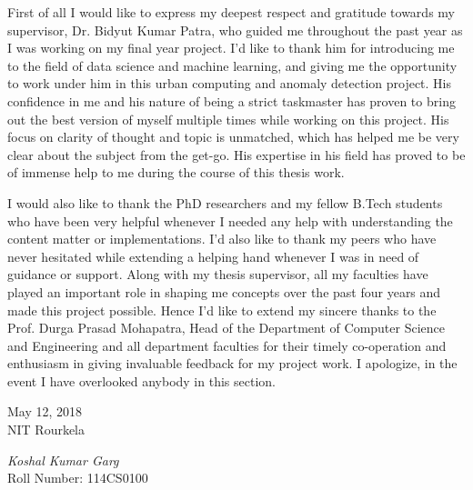 \thispagestyle{empty} 
\noindent 

First of all I would like to express my deepest respect and gratitude towards my supervisor,
Dr. Bidyut Kumar Patra, who guided me throughout the past year as I was working on my
final year project. I’d like to thank him for introducing me to the field of data science and
machine learning, and giving me the opportunity to work under him in this urban computing and anomaly detection 
project. His confidence in me and his nature of being a strict taskmaster has proven to bring
out the best version of myself multiple times while working on this project. His focus on
clarity of thought and topic is unmatched, which has helped me be very clear about the
subject from the get-go. His expertise in his field has proved to be of immense help to me
during the course of this thesis work.

\par

I would also like to thank the PhD researchers and my fellow B.Tech students who have been very helpful whenever I needed any help with understanding the
content matter or implementations. I’d also like to thank my peers who have never hesitated
while extending a helping hand whenever I was in need of guidance or support.
Along with my thesis supervisor, all my faculties have played an important role in shaping
me concepts over the past four years and made this project possible. Hence I’d like to
extend my sincere thanks to the Prof. Durga Prasad Mohapatra, Head of the Department of
Computer Science and Engineering and all department faculties for their timely co-operation
and enthusiasm in giving invaluable feedback for my project work. I
apologize, in the event I have overlooked anybody in this section.

\vspace{15mm}
\begin{minipage}{.45\linewidth}
\begin{flushleft}
May 12, 2018\\
NIT Rourkela
\end{flushleft}
\end{minipage}
\begin{minipage}{.45\linewidth}
\begin{flushright}
\textit{Koshal Kumar Garg}\\
Roll Number: 114CS0100
\end{flushright}
\end{minipage}